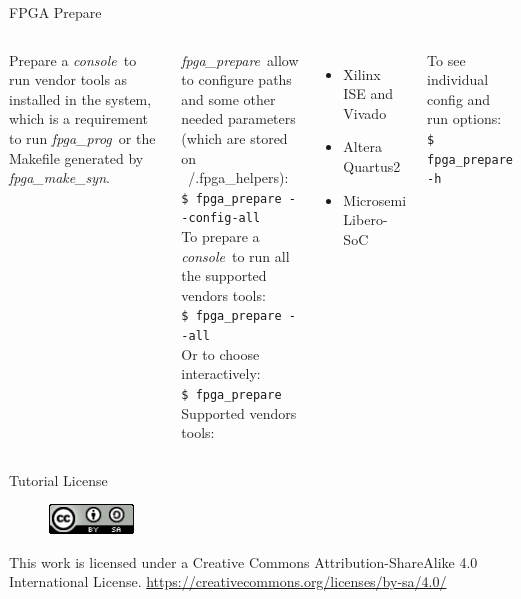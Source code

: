 \documentclass{beamer}
\newcommand{\fpgaprepare}    {\textit{fpga\_prepare}}
\newcommand{\fpgamakesyn}    {\textit{fpga\_make\_syn}}
\newcommand{\fpgaprog}       {\textit{fpga\_prog}}
\newcommand{\console}        {\textit{console}}
\newcommand{\shellcmd}[1]{\\\indent\indent\texttt{\scriptsize #1}\\}
\begin{document}
\begin{frame}{FPGA Prepare}
  \begin{columns}
      \begin{exampleblock}{}
        Prepare a \console\ to run vendor tools as installed in the system,
        which is a requirement to run \fpgaprog\ or the Makefile generated by \fpgamakesyn.
      \end{exampleblock}
      \fpgaprepare\ allow to configure paths and some other needed parameters (which are
      stored on ~/.fpga\_helpers):
      \shellcmd{\$ fpga\_prepare -{}-config-all}
      To prepare a \console\ to run all the supported vendors tools:
      \shellcmd{\$ fpga\_prepare -{}-all}
      Or to choose interactively:
      \shellcmd{\$ fpga\_prepare}
      Supported vendors tools:
      \begin{itemize}
        \item Xilinx ISE and Vivado
        \item Altera Quartus2
        \item Microsemi Libero-SoC
      \end{itemize}
      To see individual config and run options:
      \shellcmd{\$ fpga\_prepare -h}
  \end{columns}
\end{frame}


\begin{frame}{Tutorial License}
  \begin{figure}[!t]
    \includegraphics[width=0.2\textwidth]{../images/cc-by-sa.png}
  \end{figure}
  \centering
  This work is licensed under a Creative Commons Attribution-ShareAlike 4.0 International License.
  \url{https://creativecommons.org/licenses/by-sa/4.0/}
\end{frame}
\end{document}
